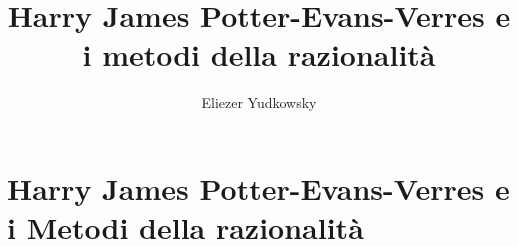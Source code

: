 \documentclass[target=mst]{thud}[2014/03/11]
\title{Harry James Potter-Evans-Verres e i metodi della razionalità}
\author{Eliezer Yudkowsky}
\begin{document}

\maketitle




\tableofcontents



\mainmatter




\chapter*{Harry James Potter-Evans-Verres e i Metodi della razionalità}







%
%
%
%
%
%
%
%
%
%
%
%
%
%
%


%

\backmatter



\newpage


%

\end{document}
